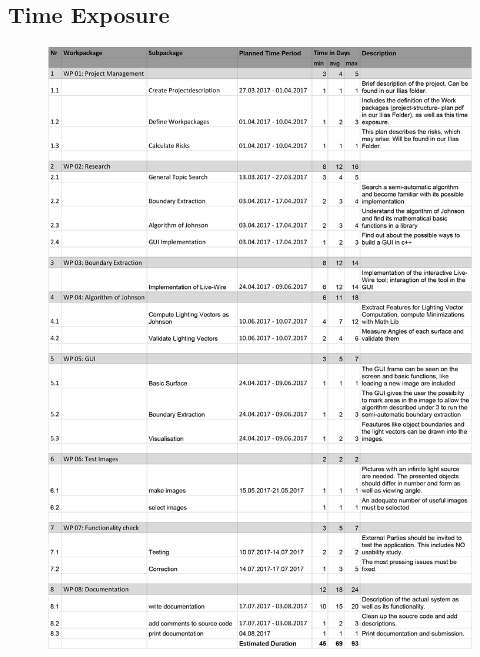 \subsection{Time Exposure} \label{sec:timeExposure}
\begin{figure}[H] 
	\center 
	\includegraphics[scale = 0.9]{Images/Project Description and Time Exposure.jpg}		
\end{figure}




